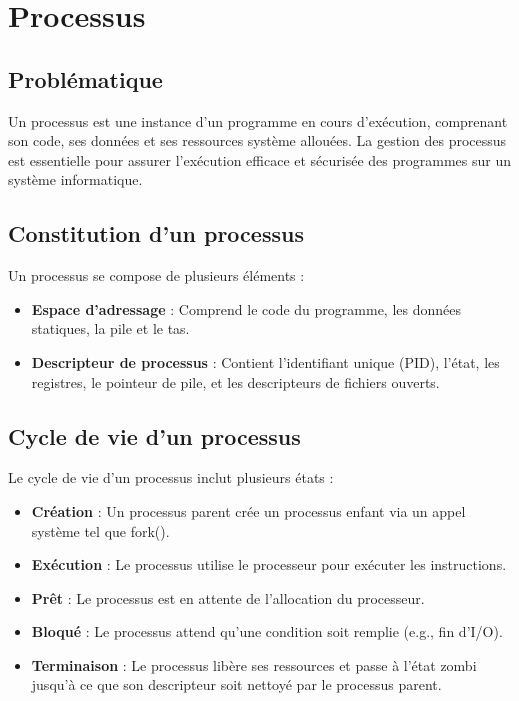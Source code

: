 \section{Processus}\label{sec:processus}

\subsection{Problématique}
Un processus est une instance d'un programme en cours d'exécution, comprenant son code, ses données et ses ressources système allouées. 
La gestion des processus est essentielle pour assurer l'exécution efficace et sécurisée des programmes sur un système informatique.

\subsection{Constitution d'un processus}
Un processus se compose de plusieurs éléments :
\begin{itemize}
    \item \textbf{Espace d'adressage} : Comprend le code du programme, les données statiques, la pile et le tas.
    \item \textbf{Descripteur de processus} : Contient l'identifiant unique (PID), l'état, les registres, le pointeur de pile, et les descripteurs de fichiers ouverts.
\end{itemize}

\subsection{Cycle de vie d'un processus}
Le cycle de vie d'un processus inclut plusieurs états :
\begin{itemize}
    \item \textbf{Création} : Un processus parent crée un processus enfant via un appel système tel que fork().
    \item \textbf{Exécution} : Le processus utilise le processeur pour exécuter les instructions.
    \item \textbf{Prêt} : Le processus est en attente de l'allocation du processeur.
    \item \textbf{Bloqué} : Le processus attend qu'une condition soit remplie (e.g., fin d'I/O).
    \item \textbf{Terminaison} : Le processus libère ses ressources et passe à l'état zombi jusqu'à ce que son descripteur soit nettoyé par le processus parent.
\end{itemize}


